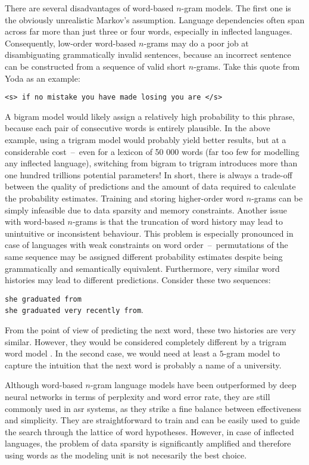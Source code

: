 	There are several disadvantages of \mbox{word-based} \mbox{$n$-gram} models. The first one is the obviously unrealistic Markov's assumption. Language dependencies often span across far more than just three or four words, especially in inflected languages. Consequently, \mbox{low-order} \mbox{word-based} \mbox{$n$-grams} may do a poor job at disambiguating grammatically invalid sentences, because an incorrect sentence can be constructed from a sequence of valid short \mbox{$n$-grams}. Take this quote from Yoda as an example:
	\begin{center}
		\texttt{<s> if no mistake you have made losing you are </s>}
	\end{center}
	A bigram model would likely assign a relatively high probability to this phrase, because each pair of consecutive words is entirely plausible. 
	In the above example, using a trigram model would probably yield better results, but at a considerable cost~--~even for a lexicon of 50 000 words (far too few for modelling any inflected language), switching from bigram to trigram introduces more than one hundred trillions potential parameters! In short, there is always a \mbox{trade-off} between the quality of predictions and the amount of data required to calculate the probability estimates. Training and storing \mbox{higher-order} word \mbox{$n$-grams} can be simply infeasible due to data sparsity and memory constraints.
	Another issue with word-based \mbox{$n$-grams} is that the truncation of word history may lead to unintuitive or inconsistent behaviour. This problem is especially pronounced in case of languages with weak constraints on word order~--~permutations of the same sequence may be assigned different probability estimates despite being grammatically and semantically equivalent. Furthermore, very similar word histories may lead to different predictions. Consider these two sequences:
	\begin{center}
		\texttt{she graduated from} \\
		\texttt{she graduated very recently from}.
	\end{center}
	From the point of view of predicting the next word, these two histories are very similar. However, they would be considered completely different by a trigram word model \cite{whittaker2000statistical}. In the second case, we would need at least a $5$-gram model to capture the intuition that the next word is probably a name of a university.

	Although \mbox{word-based} \mbox{$n$-gram} language models have been outperformed by deep neural networks in terms of perplexity and word error rate, they are still commonly used in \gls{asr} systems, as they strike a fine balance between effectiveness and simplicity. They are straightforward to train and can be easily used to guide the search through the lattice of word hypotheses. However, in case of inflected languages, the problem of data sparsity is significantly amplified and therefore using words as the modeling unit is not necesarily the best choice.
